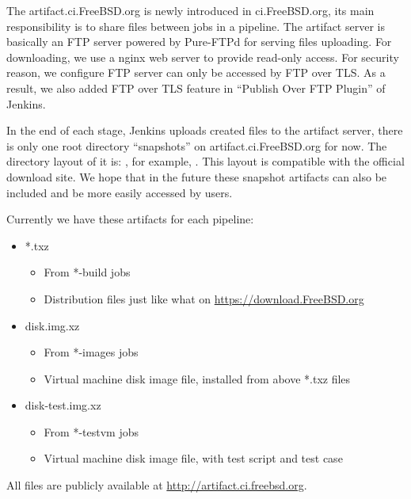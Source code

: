 \documentclass[a4paper,twocolumn,10pt]{article}
\begin{document}
The artifact.ci.FreeBSD.org is newly introduced in ci.FreeBSD.org, its main
responsibility is to share files between jobs in a pipeline.  The artifact
server is basically an FTP server powered by Pure-FTPd for serving files
uploading.  For downloading, we use a nginx \cite{nginx} web server to provide
read-only access.  For security reason, we configure FTP server can only be
accessed by FTP over TLS.  As a result, we also added FTP over TLS feature in
``Publish Over FTP Plugin'' of Jenkins.

In the end of each stage, Jenkins uploads created files to the artifact server,
there is only one root directory ``snapshots'' on artifact.ci.FreeBSD.org for
now.  The directory layout of it is:
, for example,
 . This layout is compatible with the official
download site. We hope that in the future these snapshot artifacts can also be
included and be more easily accessed by users.

Currently we have these artifacts for each pipeline:

\begin{itemize}
\item *.txz
  \begin{itemize}
  \item From *-build jobs
  \item Distribution files just like what on \url{https://download.FreeBSD.org}
  \end{itemize}
\item disk.img.xz
  \begin{itemize}
  \item From *-images jobs
  \item Virtual machine disk image file, installed from above *.txz files
  \end{itemize}
\item disk-test.img.xz
  \begin{itemize}
  \item From *-testvm jobs
  \item Virtual machine disk image file, with test script and test case
  \end{itemize}
\end{itemize}

All files are publicly available at \url{http://artifact.ci.freebsd.org}.
\end{document}
